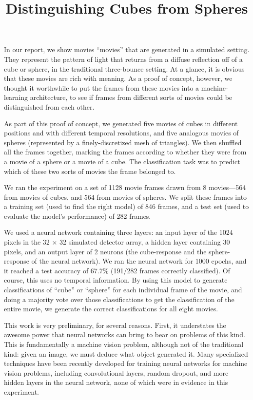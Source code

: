 \documentclass[11pt]{article}
\title{Distinguishing Cubes from Spheres}
\author{}
\begin{document}
    
\maketitle

In our report, we show movies ``movies'' that are generated in a simulated setting. They represent the pattern of light that returns from a diffuse reflection off of a cube or sphere, in the traditional three-bounce setting. At a glance, it is obvious that these movies are rich with meaning. As a proof of concept, however, we thought it worthwhile to put the frames from these movies into a machine-learning architecture, to see if frames from different sorts of movies could be distinguished from each other.

As part of this proof of concept, we generated five movies of cubes in different positions and with different temporal resolutions, and five analogous movies of spheres (represented by a finely-discretized mesh of triangles). We then shuffled all the frames together, marking the frames according to whether they were from a movie of a sphere or a movie of a cube. The classification task was to predict which of these two sorts of movies the frame belonged to.

We ran the experiment on a set of 1128 movie frames drawn from 8 movies---564 from movies of cubes, and 564 from movies of spheres. We split these frames into a training set (used to find the right model) of 846 frames, and a test set (used to evaluate the model's performance) of 282 frames. 

We used a neural network containing three layers: an input layer of the 1024 pixels in the 32 $\times$ 32 simulated detector array, a hidden layer containing 30 pixels, and an output layer of 2 neurons (the cube-response and the sphere-response of the neural network). We ran the neural network for 1000 epochs, and it reached a test accuracy of 67.7\% (191/282 frames correctly classified). Of course, this uses no temporal information. By using this model to generate classifications of ``cube'' or ``sphere'' for each individual frame of the movie, and doing a majority vote over those classifications to get the classification of the entire movie, we generate the correct classifications for all eight movies.

This work is very preliminary, for several reasons. First, it understates the awesome power that neural networks can bring to bear on problems of this kind. This is fundamentally a machine vision problem, although not of the traditional kind: given an image, we must deduce what object generated it. Many specialized techniques have been recently developed for training neural networks for machine vision problems, including convolutional layers, random dropout, and more hidden layers in the neural network, none of which were in evidence in this experiment. 
\end{document}
